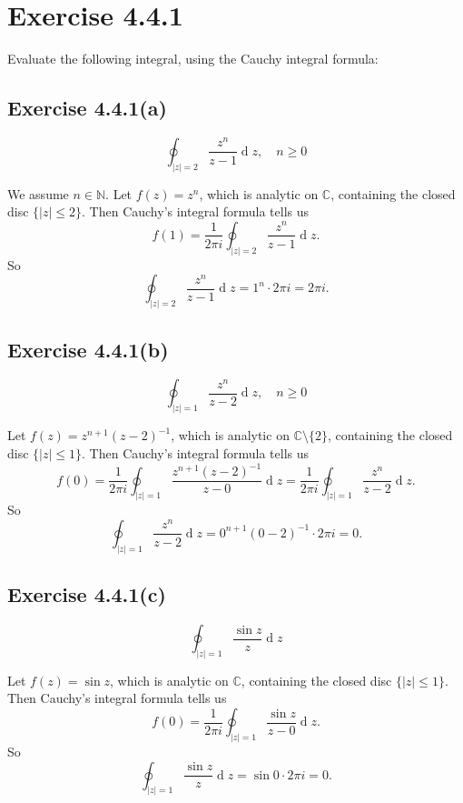 \documentclass[12pt]{article}
\newenvironment{problem}
    {\begin{lrbox}{\mybox}\begin{minipage}{0.98\textwidth}}
    {\end{minipage}\end{lrbox}\framebox[\textwidth]{\usebox{\mybox}}}
\newcommand{\N}{\mathbb{N}} %
\newcommand{\C}{\mathbb{C}} %
\newcommand{\<}{\left\langle} %
\renewcommand{\>}{\right\rangle} %
\renewcommand{\d}[1]{\operatorname{d}\!#1} %
\begin{document}
\newpage
\section{Exercise 4.4.1}
\begin{problem}
    Evaluate the following integral, using the Cauchy integral formula:
\end{problem}

\subsection{Exercise 4.4.1(a)}
\begin{problem}
    \[\oint_{|z| = 2} \frac{z^n}{z - 1} \d{z}, \quad n \geq 0\]
\end{problem}
\medskip

We assume $n \in \N$. Let $f(z) = z^n$, which is analytic on $\C$, containing the closed disc $\{|z| \leq 2\}$. Then Cauchy's integral formula tells us
\[f(1) = \frac{1}{2 \pi i} \oint_{|z| = 2}  \frac{z^n}{z - 1} \d{z}.\]
So
\[\oint_{|z| = 2}  \frac{z^n}{z - 1} \d{z} = 1^n \cdot 2 \pi i = 2 \pi i.\]

\subsection{Exercise 4.4.1(b)}
\begin{problem}
    \[\oint_{|z| = 1} \frac{z^n}{z - 2} \d{z}, \quad n \geq 0\]
\end{problem}
\medskip

Let $f(z) = z^{n + 1}(z - 2)^{-1}$, which is analytic on $\C \setminus \{2\}$, containing the closed disc $\{|z| \leq 1\}$. Then Cauchy's integral formula tells us
\[
    f(0) = \frac{1}{2 \pi i} \oint_{|z| = 1}  \frac{z^{n + 1}(z - 2)^{-1}}{z - 0} \d{z} = \frac{1}{2 \pi i} \oint_{|z| = 1} \frac{z^n}{z - 2} \d{z}.
\]
So
\[\oint_{|z| = 1}  \frac{z^n}{z - 2} \d{z} = 0^{n + 1}(0 - 2)^{-1} \cdot 2 \pi i = 0.\]


\subsection{Exercise 4.4.1(c)}
\begin{problem}
    \[\oint_{|z| = 1} \frac{\sin z}{z} \d{z}\]
\end{problem}
\medskip

Let $f(z) = \sin z$, which is analytic on $\C$, containing the closed disc $\{|z| \leq 1\}$. Then Cauchy's integral formula tells us
\[f(0) = \frac{1}{2 \pi i} \oint_{|z| = 1} \frac{\sin z}{z - 0} \d{z}.\]
So
\[\oint_{|z| = 1} \frac{\sin z}{z} \d{z} = \sin 0 \cdot 2 \pi i = 0.\]
\end{document}
